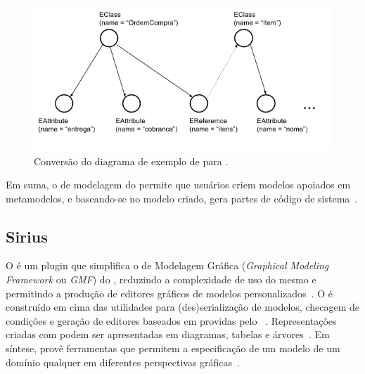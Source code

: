 \begin{figure}
	\centering
	\includegraphics[width=1\textwidth]{figuras/exemplos-emf/uml-to-ecore.png}
	\caption{Conversão do diagrama de exemplo de \uml para \ecore.}
	\label{exemplo-uml-to-ecore}
\end{figure}

Em suma, o \framework de modelagem do \eclipse permite que usuários criem modelos apoiados em metamodelos, e baseando-se no modelo criado, gera partes de código de sistema~\cite{vujovic2014comparative}.



\subsection{Sirius}

O \sirius é um plugin que simplifica o \framework de Modelagem Gráfica (\textit{Graphical Modeling Framework} ou \textit{GMF}) do \eclipse, reduzindo a complexidade de uso do mesmo e permitindo a produção de editores gráficos de modelos personalizados~\cite{viyovic2014sirius}. O \sirius é construído em cima das utilidades para (des)serialização de modelos, checagem de condições e geração de editores baseados em \ecore providas pelo \eclipse~\cite{budinsky2004eclipse}. Representações criadas com \sirius podem ser apresentadas em diagramas, tabelas e árvores~\cite{viyovic2014sirius}. Em síntese, \sirius provê ferramentas que permitem a especificação de um modelo de um domínio qualquer em diferentes perspectivas gráficas~\cite{vujovic2014comparative}.

